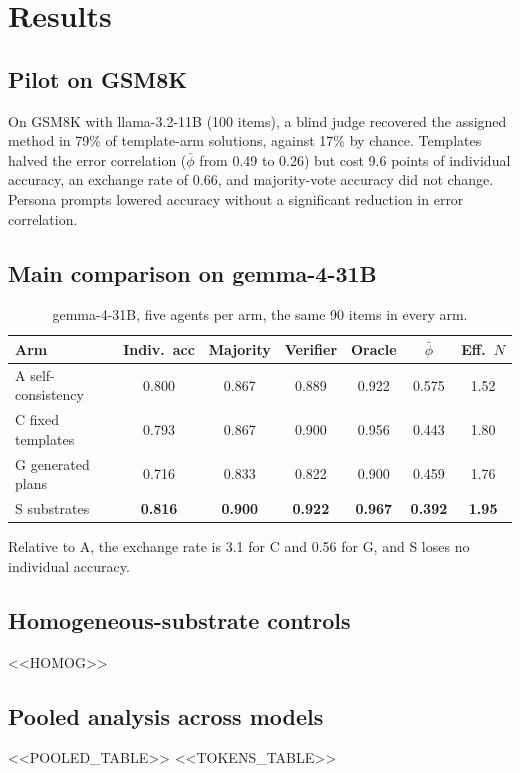 \documentclass[11pt]{article}
\begin{document}
\section{Results}\label{sec:results}
\subsection{Pilot on GSM8K}
On GSM8K with llama-3.2-11B (100 items), a blind judge recovered the assigned method in 79\% of
template-arm solutions, against 17\% by chance. Templates halved the error correlation
($\bar\phi$ from 0.49 to 0.26) but cost 9.6 points of individual accuracy, an exchange rate of
0.66, and majority-vote accuracy did not change. Persona prompts lowered accuracy without a
significant reduction in error correlation.

\subsection{Main comparison on gemma-4-31B}
\begin{table}[h]\centering\small
\begin{tabular}{lcccccc}\toprule
Arm & Indiv.\ acc & Majority & Verifier & Oracle & $\bar\phi$ & Eff.\ $N$\\\midrule
A self-consistency & 0.800 & 0.867 & 0.889 & 0.922 & 0.575 & 1.52\\
C fixed templates  & 0.793 & 0.867 & 0.900 & 0.956 & 0.443 & 1.80\\
G generated plans  & 0.716 & 0.833 & 0.822 & 0.900 & 0.459 & 1.76\\
S substrates       & \textbf{0.816} & \textbf{0.900} & \textbf{0.922} & \textbf{0.967} & \textbf{0.392} & \textbf{1.95}\\\bottomrule
\end{tabular}
\caption{gemma-4-31B, five agents per arm, the same 90 items in every arm.}
\end{table}
Relative to A, the exchange rate is 3.1 for C and 0.56 for G, and S loses no individual
accuracy.

\subsection{Homogeneous-substrate controls}
<<HOMOG>>

\subsection{Pooled analysis across models}
<<POOLED_TABLE>>
<<TOKENS_TABLE>>
\end{document}
